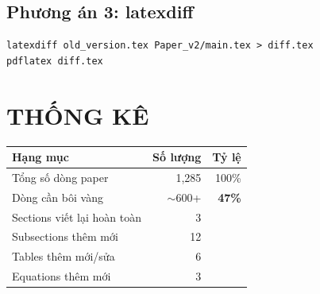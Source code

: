 \documentclass[11pt,a4paper]{article}
\begin{document}
\subsection{Phương án 3: latexdiff}
\begin{verbatim}
latexdiff old_version.tex Paper_v2/main.tex > diff.tex
pdflatex diff.tex
\end{verbatim}

\section{THỐNG KÊ}

\begin{center}
\begin{tabular}{lrr}
\toprule
\textbf{Hạng mục} & \textbf{Số lượng} & \textbf{Tỷ lệ} \\
\midrule
Tổng số dòng paper & 1,285 & 100\% \\
Dòng cần bôi vàng & $\sim$600+ & \textbf{47\%} \\
\midrule
Sections viết lại hoàn toàn & 3 & \\
Subsections thêm mới & 12 & \\
Tables thêm mới/sửa & 6 & \\
Equations thêm mới & 3 & \\
\bottomrule
\end{tabular}
\end{center}

\vspace{1em}
\noindent{}
\end{document}
